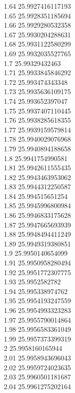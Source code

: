 {1.64	25.9927416117193\\
1.65	25.9928351185694\\
1.66	25.9929280532358\\
1.67	25.9930204288631\\
1.68	25.9931122580299\\
1.69	25.9932035527765\\
1.7	25.99329432463\\
1.71	25.9933845846292\\
1.72	25.993474343348\\
1.73	25.9935636109175\\
1.74	25.993652397047\\
1.75	25.9937407110445\\
1.76	25.9938285618355\\
1.77	25.9939159579814\\
1.78	25.9940029076968\\
1.79	25.9940894188658\\
1.8	25.9941754990581\\
1.81	25.9942611555435\\
1.82	25.9943463953062\\
1.83	25.9944312250587\\
1.84	25.994515651254\\
1.85	25.9945996800984\\
1.86	25.9946833175628\\
1.87	25.9947665693939\\
1.88	25.9948494411249\\
1.89	25.9949319380851\\
1.9	25.9950140654099\\
1.91	25.9950958280494\\
1.92	25.9951772307775\\
1.93	25.9952582782\\
1.94	25.995338974762\\
1.95	25.9954193247559\\
1.96	25.9954993323283\\
1.97	25.9955790014864\\
1.98	25.9956583361049\\
1.99	25.9957373399319\\
2	25.9958160165944\\
2.01	25.9958943696043\\
2.02	25.9959724023635\\
2.03	25.9960501181687\\
2.04	25.9961275202164\\
}
